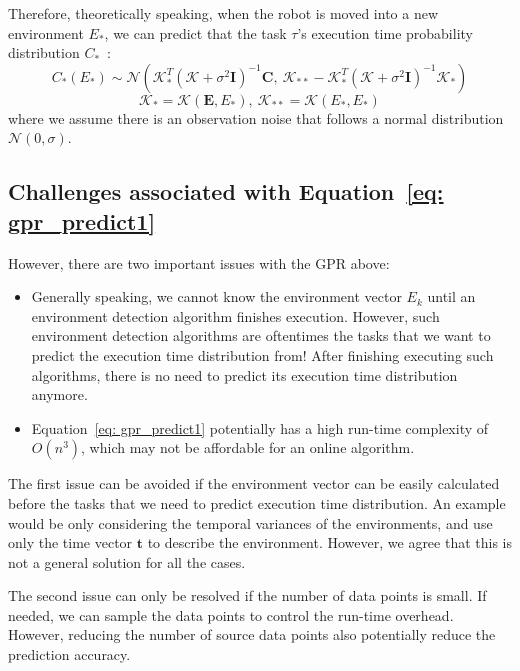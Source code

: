     Therefore, theoretically speaking, when the robot is moved into a new environment $E_{*}$, we can predict that the task $\tau$'s execution time probability distribution $C_{*}$~\cite{Rasmussen2005GaussianPF}:
	\begin{equation}
		C_{*}(E_*) \sim \mathcal{N}(\bm{\mathcal{K}}_*^T (\bm{\mathcal{K}} + \sigma^2\bm{I})^{-1}\bm{C}, \ \bm{\mathcal{K}}_{**} - \bm{\mathcal{K}}_{*}^T (\bm{\mathcal{K}} + \sigma^2\bm{I})^{-1}\bm{\mathcal{K}}_*)
        \label{eq: gpr_predict1}
	\end{equation}
	\begin{equation}
		\bm{\mathcal{K}}_* = \mathcal{K}(\bm{E}, E_* ), \ 
		\bm{\mathcal{K}}_{**}=\mathcal{K}(E_*, E_*)
	\end{equation}
    where we assume there is an observation noise that follows a normal distribution $\mathcal{N}(0, \sigma)$.

    \subsection{Challenges associated with Equation~\eqref{eq: gpr_predict1}}
    However, there are two important issues with the GPR above:
    \begin{itemize}
        \item Generally speaking, we cannot know the environment vector $E_k$ until an environment detection algorithm finishes execution. However, such environment detection algorithms are oftentimes the tasks that we want to predict the execution time distribution from! After finishing executing such algorithms, there is no need to predict its execution time distribution anymore.
        \item Equation~\eqref{eq: gpr_predict1} potentially has a high run-time complexity of $O(n^3)$, which may not be affordable for an online algorithm.
    \end{itemize}
    The first issue can be avoided if the environment vector can be easily calculated before the tasks that we need to predict execution time distribution. An example would be only considering the temporal variances of the environments, and use only the time vector $\textbf{t}$ to describe the environment. However, we agree that this is not a general solution for all the cases. 

    The second issue can only be resolved if the number of data points is small. If needed, we can sample the data points to control the run-time overhead. However, reducing the number of source data points also potentially reduce the prediction accuracy.

